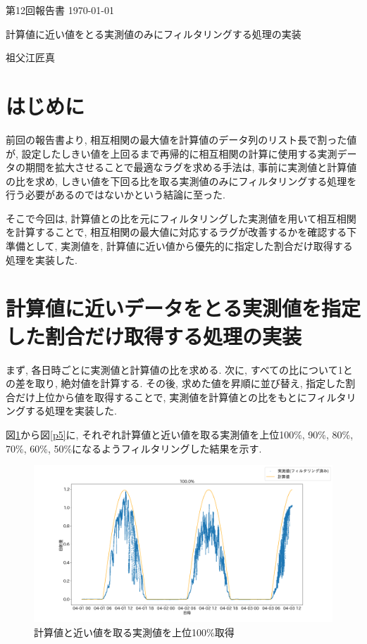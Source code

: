 \documentclass[a4j,12pt,]{jarticle}
\begin{document}
{\noindent\small 第12回報告書 \hfill\today}
\begin{center}
  {\Large 計算値に近い値をとる実測値のみにフィルタリングする処理の実装}
\end{center}
\begin{flushright}
  祖父江匠真 \\
\end{flushright}

\section{はじめに}
前回の報告書より, 相互相関の最大値を計算値のデータ列のリスト長で割った値が, 設定したしきい値を上回るまで再帰的に相互相関の計算に使用する実測データの期間を拡大させることで最適なラグを求める手法は, 事前に実測値と計算値の比を求め, しきい値を下回る比を取る実測値のみにフィルタリングする処理を行う必要があるのではないかという結論に至った.

そこで今回は, 計算値との比を元にフィルタリングした実測値を用いて相互相関を計算することで, 相互相関の最大値に対応するラグが改善するかを確認する下準備として, 実測値を, 計算値に近い値から優先的に指定した割合だけ取得する処理を実装した.

\section{計算値に近いデータをとる実測値を指定した割合だけ取得する処理の実装}
まず, 各日時ごとに実測値と計算値の比を求める.
次に, すべての比について1との差を取り, 絶対値を計算する.
その後, 求めた値を昇順に並び替え, 指定した割合だけ上位から値を取得することで, 実測値を計算値との比をもとにフィルタリングする処理を実装した.

図\ref{p1}から図\ref{p5}に, それぞれ計算値と近い値を取る実測値を上位100\%, 90\%, 80\%, 70\%, 60\%, 50\%になるようフィルタリングした結果を示す.

\begin{figure}[H]
  \begin{center}
    \includegraphics[width=160mm]{100.png}
    \caption{計算値と近い値を取る実測値を上位100\%取得}
    \label{p1}
  \end{center}
\end{figure}
\end{document}
